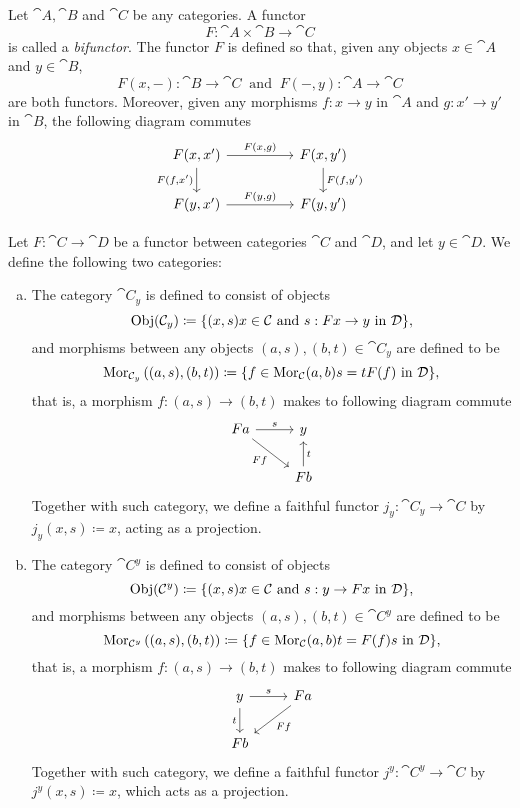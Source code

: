 \begin{proposition}[Bifunctor]\label{def:bifunctor}
Let \(\cat A, \cat B\) and \(\cat C\) be any categories. A functor
\[
  F: \cat A \times \cat B \longrightarrow \cat C
\]
is called a \emph{bifunctor}. The functor \(F\) is defined so that, given any
objects \(x \in \cat A\) and \(y \in \cat B\),
\[
  F(x, -): \cat B \longrightarrow \cat C\ \text{ and }\
  F(-, y): \cat A \longrightarrow \cat C
\]
are both functors. Moreover, given any morphisms \(f: x \to y\) in \(\cat A\)
and \(g: x' \to y'\) in \(\cat B\), the following diagram commutes
\[
  \begin{tikzcd}
    F(x, x') \ar[rr, "F{(x, g)}"] \ar[d, swap, "F{(f, x')}"]
      & &F(x, y') \ar[d, "F{(f, y')}"] \\
    F(y, x') \ar[rr, "F{(y, g)}"]
      & &F(y, y')
  \end{tikzcd}
\]
\end{proposition}

\begin{definition}
\label{def:functor-induced-cats}
Let \(F: \cat C \to \cat D\) be a functor between categories \(\cat C\) and
\(\cat D\), and let \(y \in \cat D\). We define the following two categories:
\begin{enumerate}[(a)]\setlength\itemsep{0em}
\item The category \(\cat C_y\) is defined to consist of objects
  \[
    \operatorname{Obj}(\mathcal C_y) \coloneq
    \{(x, s) \relax x \in \mathcal C \text{ and } s: F x \to y \text{ in } \mathcal D\},
  \]
  and morphisms between any objects \((a, s), (b, t) \in \cat C_{y}\) are
  defined to be
  \[
    \operatorname{Mor}_{\mathcal C_y}\left( (a, s), (b, t) \right) \coloneq
    \{f \in \operatorname{Mor}_{\mathcal C}(a, b) \relax s = t F(f) \text{ in } \mathcal D\},
  \]
  that is, a morphism \(f: (a, s) \to (b, t)\) makes to following diagram
  commute
  \[
    \begin{tikzcd}
      F a \ar[r, "s"] \ar[dr, swap, "Ff"] &y \\
      &F b \ar[u, swap, "t"]
    \end{tikzcd}
  \]
  Together with such category, we define a faithful functor \(j_y: \cat C_y \to
  \cat C\) by \(j_y(x, s) \coloneq x\), acting as a projection.
\item The category \(\cat C^y\) is defined to consist of objects
  \[
    \operatorname{Obj}(\mathcal C^y) \coloneq
    \{(x, s) \relax x \in \mathcal C \text{ and } s: y \to F x \text{ in } \mathcal D\},
  \]
  and morphisms between any objects \((a, s), (b, t) \in \cat C^{y}\) are
  defined to be
  \[
    \operatorname{Mor}_{\mathcal C^y}\left( (a, s), (b, t) \right) \coloneq
    \{f \in \operatorname{Mor}_{\mathcal C}(a, b) \relax t = F(f) s \text{ in } \mathcal D\},
  \]
  that is, a morphism \(f: (a, s) \to (b, t)\) makes to following diagram
  commute
  \[
    \begin{tikzcd}
      y \ar[r, "s"] \ar[d, swap, "t"] &Fa \ar[dl, "F f"] \\
      F b &
    \end{tikzcd}
  \]
  Together with such category, we define a faithful functor \(j^y: \cat C^y \to
  \cat C\) by \(j^y(x, s) \coloneq x\), which acts as a projection.
\end{enumerate}
\end{definition}

